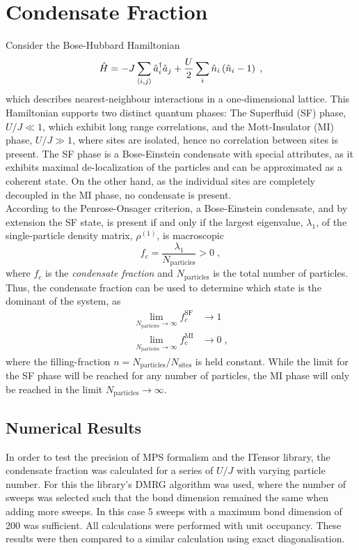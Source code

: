 \chapter{Condensate Fraction}

Consider the Bose-Hubbard Hamiltonian
\begin{equation}
	\hat{H} = -J \sum_{\braket{i,j}} \hat{a}_{i}^{\dag} \hat{a}_j + \frac{U}{2} \sum_{i} \hat{n}_i \left( \hat{n}_i -1 \right) \; , 
\end{equation}
which describes nearest-neighbour interactions in a one-dimensional lattice. This Hamiltonian supports two distinct quantum phases: The Superfluid (SF) phase, $U/J \ll 1$, which exhibit long range correlations, and the Mott-Insulator (MI) phase, $U/J \gg 1$, where sites are isolated, hence no correlation between sites is present. The SF phase is a Bose-Einstein condensate with special attributes, as it exhibits maximal de-localization of the particles and can be approximated as a coherent state. On the other hand, as the individual sites are completely decoupled in the MI phase, no condensate is present. \\
According to the Penrose-Onsager criterion, a Bose-Einstein condensate, and by extension the SF state, is present if and only if the largest eigenvalue, $\lambda_1$, of the single-particle density matrix, $\rho^{(1)}$, is macroscopic
\begin{equation}
	f_c = \frac{\lambda_1}{N_{\mathrm{particles}}} > 0 \; ,
\end{equation} 
where $f_c$ is the \textit{condensate fraction} and $N_{\mathrm{particles}}$ is the total number of particles. Thus, the condensate fraction can be used to determine which state is the dominant of the system, as
\begin{align}
	\lim_{N_{\mathrm{particles}} \to \infty} f_{c}^{\mathrm{SF}} &\to 1 \label{eq:SF_lim} \\
	\lim_{N_{\mathrm{particles}} \to \infty} f_{c}^{\mathrm{MI}} &\to 0 \; , \label{eq:MI_lim}
\end{align}
where the filling-fraction $n = N_{\mathrm{particles}}/N_{\mathrm{sites}}$ is held constant. While the limit for the SF phase will be reached for any number of particles, the MI phase will only be reached in the limit $N_{\mathrm{particles}} \to \infty$.

\section{Numerical Results}
In order to test the precision of MPS formalism and the ITensor library, the condensate fraction was calculated for a series of $U/J$ with varying particle number. For this the library's DMRG algorithm was used, where the number of sweeps was selected such that the bond dimension remained the same when adding more sweeps. In this case 5 sweeps with a maximum bond dimension of 200 was sufficient. All calculations were performed with unit occupancy. These results were then compared to a similar calculation using exact diagonalisation.

